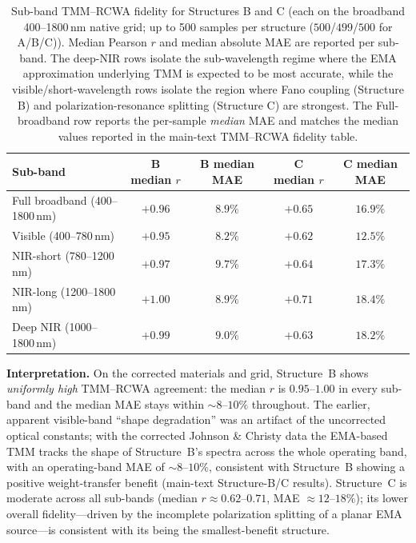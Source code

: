 \documentclass[11pt]{article}
\begin{document}
\begin{table}[htbp]\centering\small
\caption{Sub-band TMM--RCWA fidelity for Structures B and C (each on
the broadband 400--1800\,nm native grid; up to 500 samples per structure ($500$/$499$/$500$ for A/B/C)).
Median Pearson $r$ and median absolute MAE are reported per sub-band.
The deep-NIR rows isolate the sub-wavelength regime where the EMA
approximation underlying TMM is expected to be most accurate, while
the visible/short-wavelength rows isolate the region where Fano coupling
(Structure B) and polarization-resonance splitting (Structure C) are
strongest. The Full-broadband row reports the per-sample \emph{median} MAE and matches
the median values reported in the main-text TMM--RCWA fidelity table.}
\label{tab:subband_fidelity}
\begin{tabular}{lcccc}\toprule
\textbf{Sub-band} & \textbf{B median $r$} & \textbf{B median MAE} & \textbf{C median $r$} & \textbf{C median MAE}\\\midrule
Full broadband (400--1800\,nm) & $+0.96$ & $8.9\%$ & $+0.65$ & $16.9\%$\\
Visible (400--780\,nm) & $+0.95$ & $8.2\%$ & $+0.62$ & $12.5\%$\\
NIR-short (780--1200\,nm) & $+0.97$ & $9.7\%$ & $+0.64$ & $17.3\%$\\
NIR-long (1200--1800\,nm) & $\mathbf{+1.00}$ & $8.9\%$ & $+0.71$ & $18.4\%$\\
Deep NIR (1000--1800\,nm) & $+0.99$ & $9.0\%$ & $+0.63$ & $18.2\%$\\\bottomrule
\end{tabular}
\end{table}

\textbf{Interpretation.} On the corrected materials and grid, Structure~B
shows \emph{uniformly high} TMM--RCWA agreement: the median $r$ is
$0.95$--$1.00$ in every sub-band and the median MAE stays within
$\sim 8$--$10\%$ throughout. The earlier, apparent visible-band
``shape degradation'' was an artifact of the uncorrected optical constants;
with the corrected Johnson \& Christy data the EMA-based TMM tracks the shape of
Structure~B's spectra across the whole operating band, with an operating-band MAE
of $\sim 8$--$10\%$, consistent with Structure~B showing a positive
weight-transfer benefit (main-text Structure-B/C results). Structure~C is moderate
across all sub-bands (median $r \approx 0.62$--$0.71$, MAE
$\approx 12$--$18\%$); its lower overall fidelity---driven by the incomplete
polarization splitting of a planar EMA source---is consistent with its being
the smallest-benefit structure.
\end{document}
